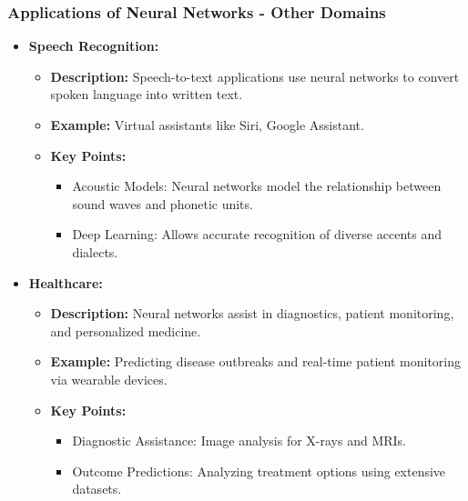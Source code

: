 \documentclass[aspectratio=169]{beamer}
\begin{document}
\begin{frame}[fragile]
    \frametitle{Applications of Neural Networks - Other Domains}
    \begin{itemize}
        \item \textbf{Speech Recognition:}
            \begin{itemize}
                \item \textbf{Description:} Speech-to-text applications use neural networks to convert spoken language into written text.
                \item \textbf{Example:} Virtual assistants like Siri, Google Assistant.
                \item \textbf{Key Points:}
                    \begin{itemize}
                        \item Acoustic Models: Neural networks model the relationship between sound waves and phonetic units.
                        \item Deep Learning: Allows accurate recognition of diverse accents and dialects.
                    \end{itemize}
            \end{itemize}
        \item \textbf{Healthcare:}
            \begin{itemize}
                \item \textbf{Description:} Neural networks assist in diagnostics, patient monitoring, and personalized medicine.
                \item \textbf{Example:} Predicting disease outbreaks and real-time patient monitoring via wearable devices.
                \item \textbf{Key Points:}
                    \begin{itemize}
                        \item Diagnostic Assistance: Image analysis for X-rays and MRIs.
                        \item Outcome Predictions: Analyzing treatment options using extensive datasets.
                    \end{itemize}
            \end{itemize}
    \end{itemize}
\end{frame}
\end{document}
